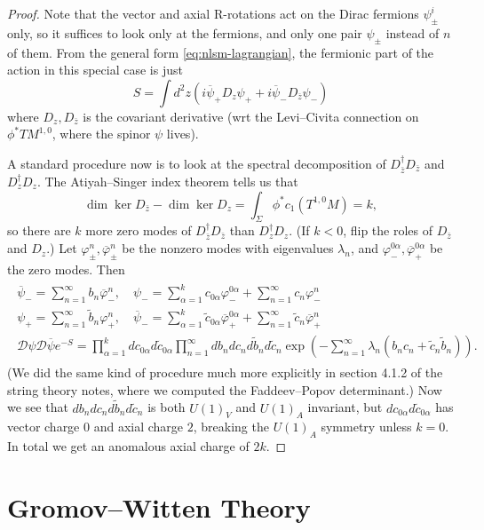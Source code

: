 \documentclass{report}
\theoremstyle{plain}
\theoremstyle{definition}
\theoremstyle{remark}
\newcommand{\cD}{\mathcal{D}}
\newcommand{\bz}{\bar{z}}
\newcommand{\cnj}{\overline}
\begin{document}
\begin{proof}
  Note that the vector and axial R-rotations act on the Dirac fermions
  $\psi_\pm^i$ only, so it suffices to look only at the fermions, and
  only one pair $\psi_\pm$ instead of $n$ of them. From the general
  form \ref{eq:nlsm-lagrangian}, the fermionic part of the action in
  this special case is just
  \[ S = \int d^2z (i\cnj\psi_+ D_z \psi_+ + i\cnj \psi_- D_{\cnj z} \psi_-) \]
  where $D_z, D_{\cnj z}$ is the covariant derivative (wrt the
  Levi--Civita connection on $\phi^*TM^{1,0}$, where the spinor $\psi$
  lives).

  A standard procedure now is to look at the spectral decomposition of
  $D_{\bz}^\dag D_{\bz}$ and $D_z^\dag D_z$. The Atiyah--Singer index
  theorem tells us that
  \[ \dim \ker D_{\bz} - \dim \ker D_z = \int_\Sigma \phi^*c_1(T^{1,0}M) = k, \]
  so there are $k$ more zero modes of $D_{\bz}^\dag D_{\bz}$ than
  $D_z^\dag D_z$. (If $k < 0$, flip the roles of $D_{\bz}$ and $D_z$.)
  Let $\varphi_\pm^n, \cnj\varphi_\pm^n$ be the nonzero modes with
  eigenvalues $\lambda_n$, and $\varphi_-^{0\alpha},
  \cnj\varphi_+^{0\alpha}$ be the zero modes. Then
  \begin{align}
    \begin{gathered}
      \cnj\psi_- = \sum_{n=1}^\infty b_n \cnj\varphi_-^n, \quad \psi_- = \sum_{\alpha=1}^k c_{0\alpha} \varphi_-^{0\alpha} + \sum_{n=1}^\infty c_n \varphi_-^n \\
      \psi_+ = \sum_{n=1}^\infty \tilde b_n \varphi_+^n, \quad \cnj\psi_- = \sum_{\alpha=1}^k \tilde c_{0\alpha} \cnj\varphi_+^{0\alpha} + \sum_{n=1}^\infty \tilde c_n \cnj\varphi_+^n \\
      \cD \psi \cD \cnj\psi e^{-S} = \prod_{\alpha=1}^k dc_{0\alpha} d\tilde c_{0\alpha} \prod_{n=1}^\infty db_n dc_n d\tilde b_n d\tilde c_n \exp\left(-\sum_{n=1}^\infty \lambda_n (b_n c_n + \tilde c_n \tilde b_n)\right).
    \end{gathered}
  \end{align}
  (We did the same kind of procedure much more explicitly in section
  4.1.2 of the string theory notes, where we computed the
  Faddeev--Popov determinant.) Now we see that $db_n dc_n d\tilde b_n
  d\tilde c_n$ is both $U(1)_V$ and $U(1)_A$ invariant, but
  $dc_{0\alpha} d\tilde c_{0\alpha}$ has vector charge $0$ and axial
  charge $2$, breaking the $U(1)_A$ symmetry unless $k = 0$. In total
  we get an anomalous axial charge of $2k$.
\end{proof}

\chapter{Gromov--Witten Theory}



\todos



\end{document}
